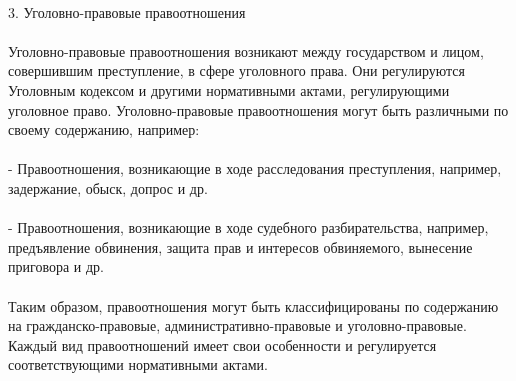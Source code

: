 \documentclass{article}
\begin{document}
~\\
3. Уголовно-правовые правоотношения\\
~\\
Уголовно-правовые правоотношения возникают между государством и лицом, совершившим преступление, в сфере уголовного права. Они регулируются Уголовным кодексом и другими нормативными актами, регулирующими уголовное право. Уголовно-правовые правоотношения могут быть различными по своему содержанию, например:\\
~\\
- Правоотношения, возникающие в ходе расследования преступления, например, задержание, обыск, допрос и др.\\
~\\
- Правоотношения, возникающие в ходе судебного разбирательства, например, предъявление обвинения, защита прав и интересов обвиняемого, вынесение приговора и др.\\
~\\
Таким образом, правоотношения могут быть классифицированы по содержанию на гражданско-правовые, административно-правовые и уголовно-правовые. Каждый вид правоотношений имеет свои особенности и регулируется соответствующими нормативными актами.
\end{document}
